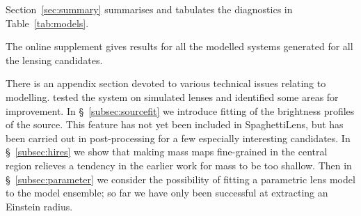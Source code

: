 Section~\ref{sec:summary} summarises and tabulates the diagnostics in
Table~\ref{tab:models}.

The online supplement gives results for all the modelled systems generated
for all the lensing candidates.

There is an appendix section
devoted to various technical issues relating to modelling.
\cite{2015MNRAS.447.2170K} tested the system on simulated lenses and
identified some areas for improvement.
In \S~\ref{subsec:sourcefit} we introduce fitting of the brightness
profiles of the source.  This feature has not yet been included in
SpaghettiLens, but has been carried out in post-processing for a few
especially interesting candidates.  In \S~\ref{subsec:hires} we show
that making mass maps fine-grained in the central region relieves a
tendency in the earlier work for mass to be too shallow. Then in
\S~\ref{subsec:parameter} we consider the possibility of fitting a
parametric lens model to the model ensemble; so far we have only been
successful at extracting an Einstein radius.

